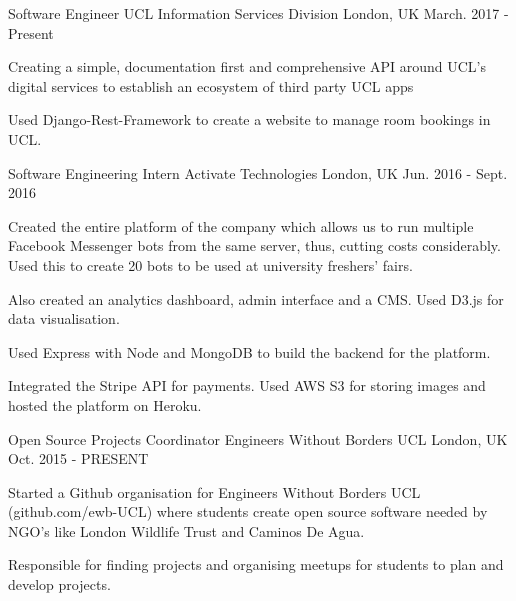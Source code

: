 

\begin{cventries}

\cventry
  {Software Engineer}
  {UCL Information Services Division}
  {London, UK}
  {March. 2017 - Present}
  {
  \begin{cvitems}
    \item {Creating a simple, documentation first and comprehensive API around
    UCL's digital services to establish an ecosystem of third party UCL apps}
    \item {Used Django-Rest-Framework to create a website to manage room bookings in UCL.}
  \end{cvitems}
  }


\cventry
  {Software Engineering Intern}
  {Activate Technologies}
  {London, UK}
  {Jun. 2016 - Sept. 2016}
  {
    \begin{cvitems}
      \item {Created the entire platform of the company which allows us to run multiple Facebook Messenger bots from the same server, thus, cutting costs considerably. Used this to create 20 bots to be used at university freshers' fairs.}
      \item {Also created an analytics dashboard, admin interface and a CMS. Used D3.js for data visualisation.}
      \item {Used Express with Node and MongoDB to build the backend for the platform.}
      \item{Integrated the Stripe API for payments. Used AWS S3 for storing images and hosted the platform on Heroku.}
    \end{cvitems}
  }

\cventry
  {Open Source Projects Coordinator}
  {Engineers Without Borders UCL}
  {London, UK}
  {Oct. 2015 - PRESENT}
  {
    \begin{cvitems}
      \item {Started a Github organisation for Engineers Without Borders UCL (github.com/ewb-UCL) where students create open source software needed by NGO's like London Wildlife Trust and Caminos De Agua.}
      \item {Responsible for finding projects and organising meetups for students to plan and develop projects.}
    \end{cvitems}
  }

\end{cventries}
